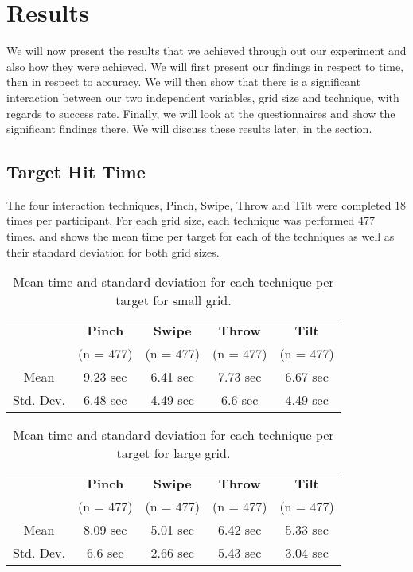 \section{Results}
We will now present the results that we achieved through out our experiment and also how they were achieved. We will first present our findings in respect to time, then in respect to accuracy. We will then show that there is a significant interaction between our two independent variables, grid size and technique, with regards to success rate. Finally, we will look at the questionnaires and show the significant findings there. We will discuss these results later, in the  section.  

\subsection{Target Hit Time}

The four interaction techniques, Pinch, Swipe, Throw and Tilt were completed 18 times per participant. For each grid size, each technique was performed 477 times.  and  shows the mean time per target for each of the techniques as well as their standard deviation for both grid sizes. 
\begin{table}[H]
	\centering
	\begin{tabular}{|c|c|c|c|c|}
		\hline
		\rowcolor[HTML]{9B9B9B} 
		 & \textbf{Pinch} & \textbf{Swipe} & \textbf{Throw} & \textbf{Tilt} \\ 
		 \rowcolor[HTML]{9B9B9B} 
		 & (n = 477) & (n = 477) & (n = 477) & (n = 477) \\ \hline
		Mean & 9.23  sec         & 6.41 sec          & 7.73 sec          & 6.67 sec         \\ \hline
		Std. Dev. & 6.48 sec & 4.49 sec & 6.6 sec & 4.49 sec \\ \hline
	\end{tabular}
	\caption{Mean time and standard deviation for each technique per target for small grid.}
	\label{tab:meanTimesTechniqueSmall}
\end{table}

\begin{table}[H]
	\centering
	\begin{tabular}{|c|c|c|c|c|}
		\hline
		\rowcolor[HTML]{9B9B9B} 
		 & \textbf{Pinch} & \textbf{Swipe} & \textbf{Throw} & \textbf{Tilt} \\
		 \rowcolor[HTML]{9B9B9B}
		 & (n = 477) & (n = 477) & (n = 477) & (n = 477) \\ \hline
		Mean & 8.09  sec         & 5.01 sec          & 6.42 sec          & 5.33 sec         \\ \hline
		Std. Dev. & 6.6 sec & 2.66 sec & 5.43 sec & 3.04 sec \\ \hline
	\end{tabular}
	\caption{Mean time and standard deviation for each technique per target for large grid.}
	\label{tab:meanTimesTechniqueLarge}
\end{table}

